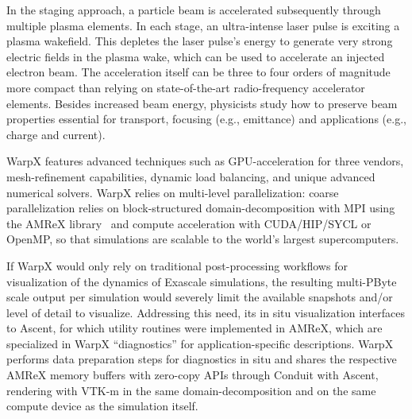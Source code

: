 In the staging approach, a particle beam is accelerated subsequently through multiple plasma elements.
In each stage, an ultra-intense laser pulse is exciting a plasma wakefield.
This depletes the laser pulse's energy to generate very strong electric fields in the plasma wake, which can be used to accelerate an injected electron beam.
The acceleration itself can be three to four orders of magnitude more compact than relying on state-of-the-art radio-frequency accelerator elements.
Besides increased beam energy, physicists study how to preserve beam properties essential for transport, focusing (e.g., emittance) and applications (e.g., charge and current).

WarpX features advanced techniques such as GPU-acceleration for three vendors, mesh-refinement capabilities, dynamic load balancing, and unique advanced numerical solvers.
WarpX relies on multi-level parallelization: coarse parallelization relies on block-structured domain-decomposition with MPI using the AMReX library~\cite{Zhang2019} and compute acceleration with CUDA/HIP/SYCL or OpenMP, so that simulations are scalable to the world's largest supercomputers.

If WarpX would only rely on traditional post-processing workflows for visualization of the dynamics of Exascale simulations, the resulting multi-PByte scale output per simulation would severely limit the available snapshots and/or level of detail to visualize.
Addressing this need, its in situ visualization interfaces to Ascent, for which utility routines were implemented in AMReX, which are specialized in WarpX ``diagnostics'' for application-specific descriptions.
WarpX performs data preparation steps for diagnostics in situ and shares the respective AMReX memory buffers with zero-copy APIs through Conduit with Ascent, rendering with VTK-m in the same domain-decomposition and on the same compute device as the simulation itself.

